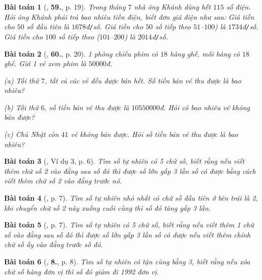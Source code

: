 \documentclass{article}
\numberwithin{equation}{section}
\newtheorem{baitoan}{Bài toán}[section]
\begin{document}
\begin{baitoan}[\cite{Trong_Toan_6_2021}, \textbf{59.}, p. 19]
	Trong tháng $7$ nhà ông Khánh dùng hết $115$ số điện. Hỏi ông Khánh phải trả bao nhiêu tiền điện, biết đơn giá điện như sau: Giá tiền cho $50$ số đầu tiên là $1678$đ\emph{\texttt{/}}số. Giá tiền cho $50$ số tiếp theo $51$--$100$) là $1734$đ\emph{\texttt{/}}số. Giá tiền cho $100$ số tiếp theo ($101$--$200$) là $2014$đ\emph{\texttt{/}}số.
\end{baitoan}

\begin{baitoan}[\cite{Trong_Toan_6_2021}, \textbf{60.}, p. 20]
	1 phòng chiếu phim có $18$ hàng ghế, mỗi hàng có $18$ ghế. Giá 1 vé xem phim là $50000$đ.
	\begin{enumerate*}
		\item[(a)] Tối thứ $7$, tất cả các vé đều được bán hết. Số tiền bán vé thu được là bao nhiêu?
		\item[(b)] Tối thứ $6$, số tiền bán vé thu được là $10550000$đ. Hỏi có bao nhiêu vé không bán được?
		\item[(c)] Chủ Nhật còn $41$ vé không bán được. Hỏi số tiền bán vé thu được là bao nhiêu?
	\end{enumerate*}
\end{baitoan}

\begin{baitoan}[\cite{Binh_Toan_6_tap_1}, Ví dụ 3, p. 6]
	Tìm số tự nhiên có 5 chữ số, biết rằng nếu viết thêm chữ số 2 vào đằng sau số đó thì được số lớn gấp 3 lần số có được bằng cách viết thêm chữ số 2 vào đằng trước nó.
\end{baitoan}

\begin{baitoan}[\cite{Binh_Toan_6_tap_1}, p. 7]
	Tìm số tự nhiên nhỏ nhất có chữ số đầu tiên ở bên trái là 2, khi chuyển chữ số 2 này xuống cuối cùng thì số đó tăng gấp 3 lần.
\end{baitoan}

\begin{baitoan}[\cite{Binh_Toan_6_tap_1}, p. 7]
	Tìm số tự nhiên có 5 chữ số, biết rằng nếu viết thêm 1 chữ số vào đằng sau số đó thì được số lớn gấp 3 lần số có được nếu viết thêm chính chữ số ấy vào đằng trước số đó.
\end{baitoan}

\begin{baitoan}[\cite{Binh_Toan_6_tap_1}, \textbf{8.}, p. 8]
	Tìm số tự nhiên có tận cùng bằng 3, biết rằng nếu xóa chữ số hàng đơn vị thì số đó giảm đi 1992 đơn vị.
\end{baitoan}
\end{document}
